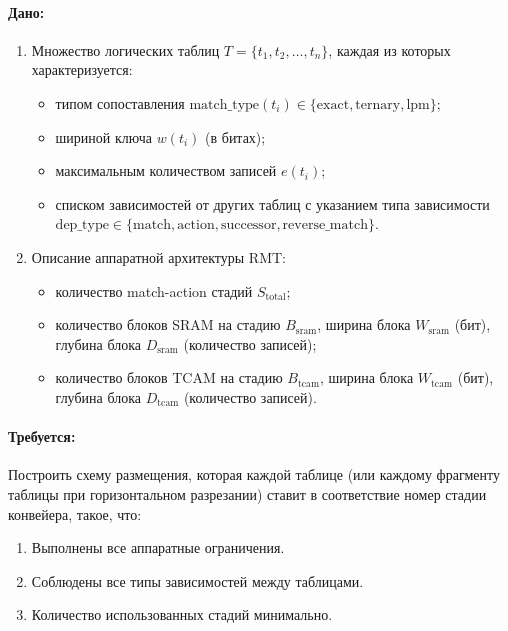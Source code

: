 \paragraph{Дано:}
\begin{enumerate}
    \item Множество логических таблиц \( T = \{t_1, t_2, \dots, t_n\} \), каждая из которых характеризуется:
        \begin{itemize}
            \item типом сопоставления \( \text{match\_type}(t_i) \in \{\text{exact}, \text{ternary}, \text{lpm}\} \);
            \item шириной ключа \( w(t_i) \) (в битах);
            \item максимальным количеством записей \( e(t_i) \);
            \item списком зависимостей от других таблиц с указанием типа зависимости \( \text{dep\_type} \in \{\text{match}, \text{action}, \text{successor}, \text{reverse\_match}\} \).
        \end{itemize}
    \item Описание аппаратной архитектуры RMT:
        \begin{itemize}
            \item количество match-action стадий \( S_{\text{total}} \);
            \item количество блоков SRAM на стадию \( B_{\text{sram}} \), ширина блока \( W_{\text{sram}} \) (бит), глубина блока \( D_{\text{sram}} \) (количество записей);
            \item количество блоков TCAM на стадию \( B_{\text{tcam}} \), ширина блока \( W_{\text{tcam}} \) (бит), глубина блока \( D_{\text{tcam}} \) (количество записей).
        \end{itemize}
\end{enumerate}

\paragraph{Требуется:}
Построить схему размещения, которая каждой таблице (или каждому фрагменту таблицы при горизонтальном разрезании) ставит в соответствие номер стадии конвейера, такое, что:
\begin{enumerate}
    \item Выполнены все аппаратные ограничения.
    \item Соблюдены все типы зависимостей между таблицами.
    \item Количество использованных стадий минимально.
\end{enumerate}



    


